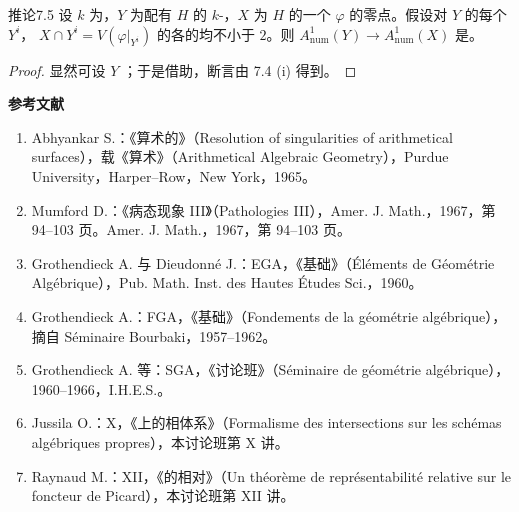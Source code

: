 \begin{SGAresult}{推论}{7.5}
设 $k$ 为，$Y$ 为配有 $H$ 的 $k$-，$X$ 为 $H$ 的一个 $\varphi$ 的零点。假设对 $Y$ 的每个 $Y^i$，
$X\cap Y^i=V(\varphi|_{Y^i})$ 的各的均不小于 $2$。则 $A^1_{\mathrm{num}}(Y)\to A^1_{\mathrm{num}}(X)$ 是。
\end{SGAresult}
\begin{proof}
显然可设 $Y$ ；于是借助，断言由 7.4 (i) 得到。
\end{proof}

\textbf{参考文献}
\begin{enumerate}
\item[{[1]}] Abhyankar S.：《算术的》（Resolution of singularities of arithmetical surfaces），载《算术》（Arithmetical Algebraic Geometry），Purdue University，Harper--Row，New York，1965。
\item[{[2]}] Mumford D.：《病态现象 III》（Pathologies III），Amer. J. Math.，1967，第 94--103 页。Amer. J. Math.，1967，第 94--103 页。
\item[{[3]}] Grothendieck A. 与 Dieudonné J.：EGA，《基础》（Éléments de Géométrie Algébrique），Pub. Math. Inst. des Hautes Études Sci.，1960。
\item[{[4]}] Grothendieck A.：FGA，《基础》（Fondements de la géométrie algébrique），摘自 Séminaire Bourbaki，1957--1962。
\item[{[5]}] Grothendieck A. 等：SGA，《讨论班》（Séminaire de géométrie algébrique），1960--1966，I.H.E.S.。
\item[{[6]}] Jussila O.：X，《上的相体系》（Formalisme des intersections sur les schémas algébriques propres），本讨论班第 X 讲。
\item[{[7]}] Raynaud M.：XII，《的相对》（Un théorème de représentabilité relative sur le foncteur de Picard），本讨论班第 XII 讲。
\end{enumerate}
